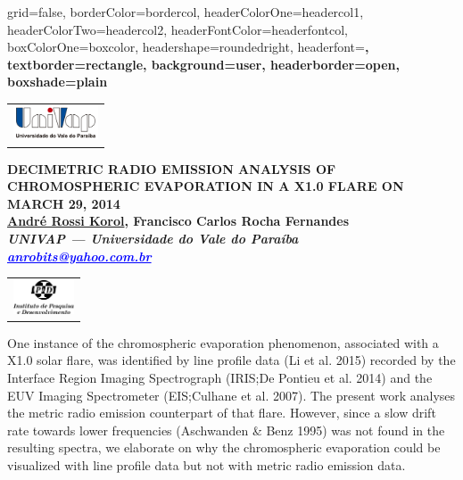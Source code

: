 \documentclass[a0paper,portrait]{baposter}
\begin{document}
\begin{poster}
{grid=false,
borderColor=bordercol, %
headerColorOne=headercol1, %
headerColorTwo=headercol2, %
headerFontColor=headerfontcol, %
boxColorOne=boxcolor, %
headershape=roundedright, %
headerfont=\Large\sf\bf, %
textborder=rectangle,
background=user,
headerborder=open, %
boxshade=plain
}
{\begin{tabular}{c}
        \includegraphics[height=1cm]{UNIVAP-SF.png}\\
\end{tabular}
}
%
%
{\bf  \LARGE {DECIMETRIC RADIO EMISSION ANALYSIS OF CHROMOSPHERIC EVAPORATION IN A X1.0 FLARE ON MARCH 29, 2014} \\ %
\vspace{0.2cm}
\footnotesize \underline{André Rossi Korol}, Francisco Carlos Rocha Fernandes\\  %
\footnotesize \it UNIVAP --- Universidade do Vale do Paraíba\\ %
\footnotesize \it \textcolor{blue}{\underline{anrobits@yahoo.com.br}}\/}

{\begin{tabular}{c}
        \includegraphics[height=1cm]{ipd2-sf.png}
\end{tabular}
}

{One instance of the chromospheric evaporation phenomenon, associated with a X1.0
    solar flare, was identified by line profile data (Li et al. 2015) recorded by
    the Interface Region Imaging Spectrograph (IRIS;\@ De Pontieu et al. 2014) and
    the EUV Imaging Spectrometer (EIS;\@ Culhane et al. 2007). The present work analyses
    the metric radio emission counterpart of that flare. However, since a slow drift
    rate towards lower frequencies (Aschwanden \& Benz 1995) was not found in the
    resulting spectra, we elaborate on why the chromospheric evaporation could be 
    visualized with line profile data but not with metric radio emission data.

}
\end{poster}
\end{document}
